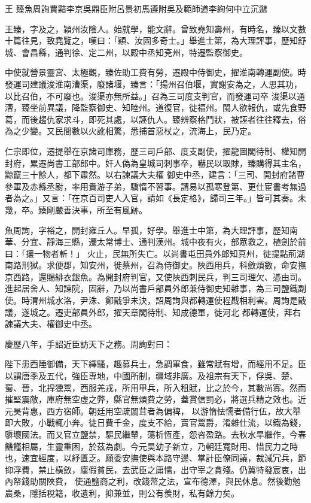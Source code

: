 
\begin{pinyinscope}

 王
 臻魚周詢賈黯李京吳鼎臣附呂景初馬遵附吳及範師道李絢何中立沉邈



 王臻，字及之，穎州汝陰人。始就學，能文辭。曾致堯知壽州，有時名，臻以文數十篇往見，致堯覽之，嘆曰：「穎、汝固多奇士。」舉進士第，為大理評事，歷知舒城、會昌縣，通判徐、定二州，以殿中丞知兗州，特遷監察御史。



 中使就營景靈宮、太極觀，臻佐助工費有勞，遷殿中侍御史，擢淮南轉運副使。時發運司建議浚淮南漕渠，廢諸堰，臻言：「揚州召伯堰，實謝安為之，人思其功，以比召伯，不可廢也。浚渠亦無所益。」召為三司度支判官，而發運司卒
 浚渠以通漕，臻坐前異議，降監察御史、知睦州。道復官，徙福州。閩人欲報仇，或先食野葛，而後趨仇家求斗，即死其處，以誣仇人。臻辨察格鬥狀，被誣者往往釋去，俗為之少變。又民間數以火訛相驚，悉捕首惡杖之，流海上，民乃定。



 仁宗即位，遷提舉在京諸司庫務，歷三司戶部、度支副使，擢龍圖閣待制、權知開封府，累遷尚書工部郎中。奸人偽為皇城司刺事卒，嚇民以取賕，臻購得其主名，黥竄三十餘人，都下肅然。以右諫議大夫權
 御史中丞，建言：「三司、開封府諸曹參軍及赤縣丞尉，率用貴游子弟，驕惰不習事。請易以孤寒登第、更仕宦書考無過者為之。」又言：「在京百司吏人入官，請如《長定格》，歸司三年。」皆可其奏。未幾，卒。臻剛嚴善決事，所至有風跡。



 魚周詢，字裕之，開封雍丘人。早孤，好學。舉進士中第，為大理評事，歷知南華、分宜、靜海三縣，遷太常博士、通判漢州。城中夜有火，部眾救之，植劍於前曰：「攘一物者斬！」
 火止，民無所失亡。以尚書屯田員外郎知真州，徙提點荊湖南路刑獄。求便郡，知安州，徙蔡州，召為侍御史。陜西用兵，科斂煩數，命安撫京西路，還賜緋衣銀魚。為開封府判官，又使陜西刺民兵，判三司理欠、憑由司。進起居舍人、知諫院，固辭，乃以尚書戶部員外郎兼侍御史知雜事，為三司鹽鐵副使。時渭州城水洛，尹洙、鄭戩爭未決，詔周詢與都轉運使程戡相利害。周詢是戩議，遂城之。遷吏部員外郎，擢天章閣待制、知成德軍，徙河北
 都轉運使，拜右諫議大夫、權御史中丞。



 慶歷八年，手詔近臣訪天下之務。周詢對曰：



 陛下患西陲御備，天下繹騷，趣募兵士，急調軍食，雖常賦有增，而經用不足。臣以謂唐季及五代，強臣專地，中國所制，疆域非廣。及祖宗有天下，俘吳、楚、蜀、晉，北捍獯鬻，西服羌戎，所用甲兵，所入租賦，比之於今，其數尚寡。然而摧堅震敵，庫府無空虛之弊，縣官無煩費之勞，蓋賞信罰必，將選兵精之效也。近元昊背惠，西方宿師。朝廷用空疏闒茸者為偏裨，
 以游惰怯懦者備行伍，故大舉即大敗，小戰輒小奔。徒日費千金，度支不給，賣官鬻爵，淆雜仕流，以鐵為錢，隳壞國法。而又官立鹽禁，驅民繼輦，蕩析恆產，怨咨盈路。去秋水旱繼作，今春饑饉相屬，生靈重困，於茲為劇。今元昊幼子新立，乃朝廷寬財用、惜民力之時也，速宜經度，以紓匱乏。願委安撫使與本路守邊、掌計臣僚同議，裁減冗兵，節抑浮費，禁止橫斂，廩假貧民，去武臣之庸懦，出守宰之貪殘。仍冀特發宸衷，出內帑錢助關陜費，
 使通鹽商之利，改錢幣之法，宣布德澤，與民休息。然後勸勉農桑，隱括稅籍，收遺利，抑兼並，則公有羨財，私有餘力矣。




\end{pinyinscope}
